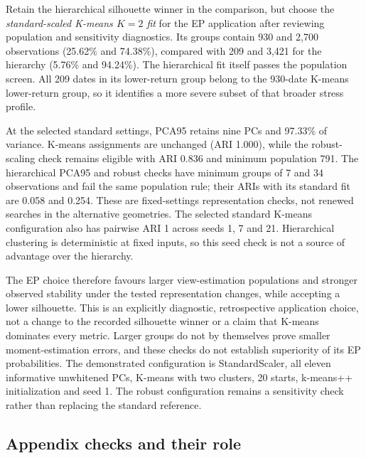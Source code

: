 \documentclass[11pt,a4paper]{article}
\begin{document}
Retain the hierarchical silhouette winner in the comparison, but choose the \emph{standard-scaled K-means $K=2$ fit} for the EP application after reviewing population and sensitivity diagnostics. Its groups contain 930 and 2,700 observations (25.62\% and 74.38\%), compared with 209 and 3,421 for the hierarchy (5.76\% and 94.24\%). The hierarchical fit itself passes the population screen. All 209 dates in its lower-return group belong to the 930-date K-means lower-return group, so it identifies a more severe subset of that broader stress profile.



At the selected standard settings, PCA95 retains nine PCs and 97.33\% of variance. K-means assignments are unchanged (ARI 1.000), while the robust-scaling check remains eligible with ARI 0.836 and minimum population 791. The hierarchical PCA95 and robust checks have minimum groups of 7 and 34 observations and fail the same population rule; their ARIs with its standard fit are 0.058 and 0.254. These are fixed-settings representation checks, not renewed searches in the alternative geometries. The selected standard K-means configuration also has pairwise ARI 1 across seeds 1, 7 and 21. Hierarchical clustering is deterministic at fixed inputs, so this seed check is not a source of advantage over the hierarchy.

The EP choice therefore favours larger view-estimation populations and stronger observed stability under the tested representation changes, while accepting a lower silhouette. This is an explicitly diagnostic, retrospective application choice, not a change to the recorded silhouette winner or a claim that K-means dominates every metric. Larger groups do not by themselves prove smaller moment-estimation errors, and these checks do not establish superiority of its EP probabilities. The demonstrated configuration is StandardScaler, all eleven informative unwhitened PCs, K-means with two clusters, 20 starts, k-means++ initialization and seed 1. The robust configuration remains a sensitivity check rather than replacing the standard reference.

\subsection{Appendix checks and their role}
\end{document}
